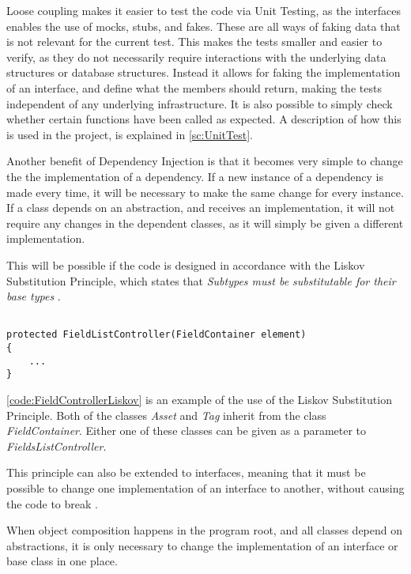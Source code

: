 Loose coupling makes it easier to test the code via Unit Testing, as the interfaces enables the use of mocks, stubs, and fakes. These are all ways of faking data that is not relevant for the current test. This makes the tests smaller and easier to verify, as they do not necessarily require interactions with the underlying data structures or database structures. Instead it allows for faking the implementation of an interface, and define what the members should return, making the tests independent of any underlying infrastructure. It is also possible to simply check whether certain functions have been called as expected. A description of how this is used in the project, is explained in \autoref{sc:UnitTest}.
\par

Another benefit of Dependency Injection is that it becomes very simple to change the the implementation of a dependency. If a new instance of a dependency is made every time, it will be necessary to make the same change for every instance. If a class depends on an abstraction, and receives an implementation, it will not require any changes in the dependent classes, as it will simply be given a different implementation. 
\par
This will be possible if the code is designed in accordance with the Liskov Substitution Principle, which states that \textit{Subtypes must be substitutable for their base types} \citep{AgilePPP}. 

\begin{listing}[H]
\begin{verbatim}

protected FieldListController(FieldContainer element)
{
    ...
}

\end{verbatim}
\label{code:FieldControllerLiskov}
\end{listing}

\autoref{code:FieldControllerLiskov} is an example of the use of the Liskov Substitution Principle. Both of the classes \textit{Asset} and \textit{Tag} inherit from the class \textit{FieldContainer}. Either one of these classes can be given as a parameter to \textit{FieldsListController}. 
\par
This principle can also be extended to interfaces, meaning that it must be possible to change one implementation of an interface to another, without causing the code to break \citep{seemann2019dependency}. 
\par
When object composition happens in the program root, and all classes depend on abstractions, it is only necessary to change the implementation of an interface or base class in one place.

